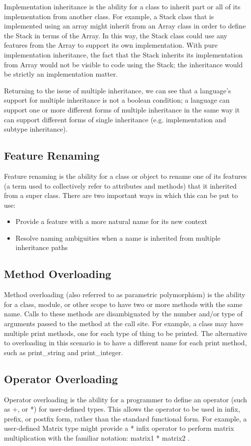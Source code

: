 \documentclass[12pt,a4paper,final,twoside,onecolumn,titlepage]{book}
\begin{document}
Implementation inheritance is the ability for a class to inherit part or all of its implementation from another class. For example, a Stack class that is implemented using an array might inherit from an Array class in order to define the Stack in terms of the Array. In this way, the Stack class could use any features from the Array to support its own implementation. With pure implementation inheritance, the fact that the Stack inherits its implementation from Array would not be visible to code using the Stack; the inheritance would be strictly an implementation matter. 

Returning to the issue of multiple inheritance, we can see that a language's support for multiple inheritance is not a boolean condition; a language can support one or more different forms of multiple inheritance in the same way it can support different forms of single inheritance (e.g. implementation and subtype inheritance). 

\subsection{Feature Renaming}
Feature renaming is the ability for a class or object to rename one of its features (a term used to collectively refer to attributes and methods) that it inherited from a super class. There are two important ways in which this can be put to use:
\begin{itemize}
\item Provide a feature with a more natural name for its new context
\item Resolve naming ambiguities when a name is inherited from multiple inheritance paths
\end{itemize}

\subsection{Method Overloading}
Method overloading (also referred to as parametric polymorphism) is the ability for a class, module, or other scope to have two or more methods with the same name. Calls to these methods are disambiguated by the number and/or type of arguments passed to the method at the call site. For example, a class may have multiple print methods, one for each type of thing to be printed. The alternative to overloading in this scenario is to have a different name for each print method, such as print\_string and print\_integer.

\subsection{Operator Overloading}
Operator overloading is the ability for a programmer to define an operator (such as +, or *) for user-defined types. This allows the operator to be used in infix, prefix, or postfix form, rather than the standard functional form. For example, a user-defined Matrix type might provide a * infix operator to perform matrix multiplication with the familiar notation: matrix1 * matrix2 .
\end{document}
